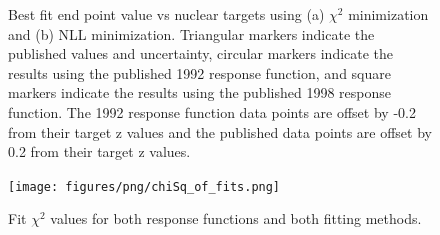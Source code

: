 \begin{figure}[h]
  \centering
  \hfill
  \caption{Best fit end point value vs nuclear targets using (a) $\chi^2$ minimization and (b) NLL minimization.
    Triangular markers indicate the published values and uncertainty, circular markers indicate the results
    using the published 1992 response function, and square markers indicate the results using the published
    1998 response function. The 1992 response function data points are offset by -0.2 from their target z values
    and the published data points are offset by 0.2 from their target z values.
  }
\end{figure}
\begin{figure}[h]
  \centering
  \texttt{[image: figures/png/chiSq\_of\_fits.png]}
  \caption{Fit $\chi^2$ values for both response functions and both fitting methods. }
  \label{fig:ChiSqOfFits}
\end{figure}




